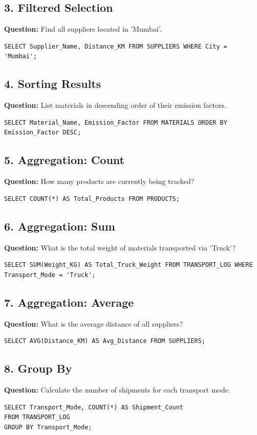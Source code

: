 \documentclass[12pt,a4paper]{article}
\begin{document}
\subsection*{3. Filtered Selection}
\textbf{Question:} Find all suppliers located in 'Mumbai'.
\begin{lstlisting}
SELECT Supplier_Name, Distance_KM FROM SUPPLIERS WHERE City = 'Mumbai';
\end{lstlisting}

\subsection*{4. Sorting Results}
\textbf{Question:} List materials in descending order of their emission factors.
\begin{lstlisting}
SELECT Material_Name, Emission_Factor FROM MATERIALS ORDER BY Emission_Factor DESC;
\end{lstlisting}

\subsection*{5. Aggregation: Count}
\textbf{Question:} How many products are currently being tracked?
\begin{lstlisting}
SELECT COUNT(*) AS Total_Products FROM PRODUCTS;
\end{lstlisting}

\subsection*{6. Aggregation: Sum}
\textbf{Question:} What is the total weight of materials transported via 'Truck'?
\begin{lstlisting}
SELECT SUM(Weight_KG) AS Total_Truck_Weight FROM TRANSPORT_LOG WHERE Transport_Mode = 'Truck';
\end{lstlisting}

\subsection*{7. Aggregation: Average}
\textbf{Question:} What is the average distance of all suppliers?
\begin{lstlisting}
SELECT AVG(Distance_KM) AS Avg_Distance FROM SUPPLIERS;
\end{lstlisting}

\subsection*{8. Group By}
\textbf{Question:} Calculate the number of shipments for each transport mode.
\begin{lstlisting}
SELECT Transport_Mode, COUNT(*) AS Shipment_Count 
FROM TRANSPORT_LOG 
GROUP BY Transport_Mode;
\end{lstlisting}
\end{document}
